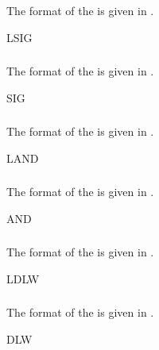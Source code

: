 \subsubsection{}\label{sec:LSIGBlock}
The format of the  is given in .
\begin{BlockTable}{LSIG}
  \label{tab:LSIGBlock}
\end{BlockTable}

\subsubsection{}\label{sec:SIGBlock}
The format of the  is given in .
\begin{BlockTable}{SIG}
  \label{tab:SIGBlock}
\end{BlockTable}

\subsubsection{}\label{sec:LANDBlock}
The format of the  is given in .
\begin{BlockTable}{LAND}
  \label{tab:LANDBlock}
\end{BlockTable}

\subsubsection{}\label{sec:ANDBlock}
The format of the  is given in .
\begin{BlockTable}{AND}
  \label{tab:ANDBlock}
\end{BlockTable}

\subsubsection{}\label{sec:LDLWBlock}
The format of the  is given in .
\begin{BlockTable}{LDLW}
  \label{tab:LDLWBlock}
\end{BlockTable}

\subsubsection{}\label{sec:DLWBlock}
The format of the  is given in .
\begin{BlockTable}{DLW}
  \label{tab:DLWBlock}
\end{BlockTable}

